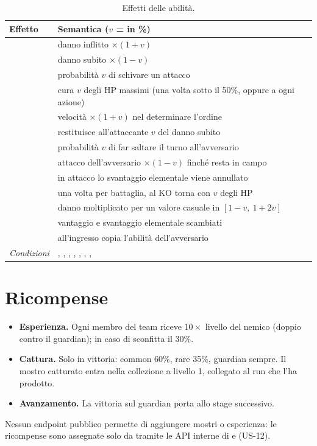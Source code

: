 \documentclass[11pt,a4paper]{report}
\begin{document}
\begin{table}[ht]
\centering\small
\begin{tabularx}{\linewidth}{@{}P{3.3cm}L@{}}
\toprule
\textbf{Effetto} & \textbf{Semantica ($v$ =  in \%)} \\
\midrule
{} & danno inflitto $\times(1+v)$ \\
 & danno subito $\times(1-v)$ \\
 & probabilità $v$ di schivare un attacco \\
 & cura $v$ degli HP massimi (una volta sotto il 50\%, oppure a ogni azione) \\
 & velocità $\times(1+v)$ nel determinare l'ordine \\
 & restituisce all'attaccante $v$ del danno subito \\
 & probabilità $v$ di far saltare il turno all'avversario \\
 & attacco dell'avversario $\times(1-v)$ finché resta in campo \\
 & in attacco lo svantaggio elementale viene annullato \\
 & una volta per battaglia, al KO torna con $v$ degli HP \\
 & danno moltiplicato per un valore casuale in $[1-v,\ 1+2v]$ \\
 & vantaggio e svantaggio elementale scambiati \\
 & all'ingresso copia l'abilità dell'avversario \\
\midrule
\textit{Condizioni} & , , , , , , ,  \\
\bottomrule
\end{tabularx}
\caption{Effetti delle abilità.}
\label{tab:abilities}
\end{table}

\section{Ricompense}

\begin{itemize}
  \item \textbf{Esperienza.} Ogni membro del team riceve $10 \times$ livello del nemico (doppio contro il guardian); in caso di sconfitta il 30\%.
  \item \textbf{Cattura.} Solo in vittoria: common 60\%, rare 35\%, guardian sempre. Il mostro catturato entra nella collezione a livello 1, collegato al run che l'ha prodotto.
  \item \textbf{Avanzamento.} La vittoria sul guardian porta allo stage successivo.
\end{itemize}
Nessun endpoint pubblico permette di aggiungere mostri o esperienza: le ricompense sono assegnate solo da  tramite le API interne di  e  (US-12).
\end{document}
